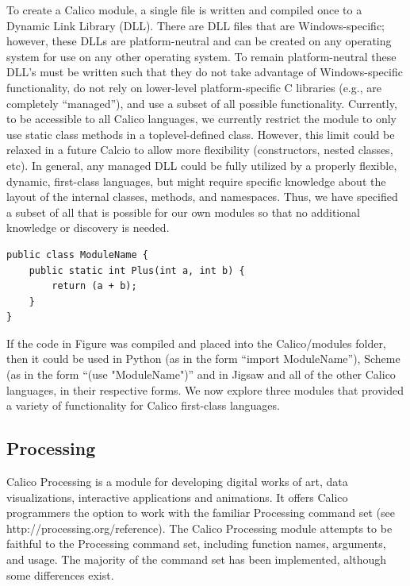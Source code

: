 \documentclass[preprint]{sigplanconf}
\begin{document}
To create a Calico module, a single file is written and compiled once
to a Dynamic Link Library (DLL). There are DLL files that are
Windows-specific; however, these DLLs are platform-neutral and can be
created on any operating system for use on any other operating
system. To remain platform-neutral these DLL's must be written such
that they do not take advantage of Windows-specific functionality, do
not rely on lower-level platform-specific C libraries (e.g., are
completely ``managed''), and use a subset of all possible
functionality. Currently, to be accessible to all Calico languages, we
currently restrict the module to only use static class methods in a
toplevel-defined class. However, this limit could be relaxed in a
future Calcio to allow more flexibility (constructors, nested classes,
etc). In general, any managed DLL could be fully utilized by a
properly flexible, dynamic, first-class languages, but might require
specific knowledge about the layout of the internal classes, methods,
and namespaces. Thus, we have specified a subset of all that is
possible for our own modules so that no additional knowledge or
discovery is needed.

\begin{verbatim}
public class ModuleName {
    public static int Plus(int a, int b) {
        return (a + b);
    }
}
\end{verbatim}

If the code in Figure was compiled and placed into the Calico/modules
folder, then it could be used in Python (as in the form ``import
ModuleName''), Scheme (as in the form ``(use "ModuleName")'' and in
Jigsaw and all of the other Calico languages, in their respective
forms. We now explore three modules that provided a variety of
functionality for Calico first-class languages.

\subsection{Processing}

Calico Processing is a module for developing digital works of art,
data visualizations, interactive applications and animations. It
offers Calico programmers the option to work with the familiar
Processing command set (see http://processing.org/reference). The
Calico Processing module attempts to be faithful to the Processing
command set, including function names, arguments, and usage. The
majority of the command set has been implemented, although some
differences exist.
\end{document}

